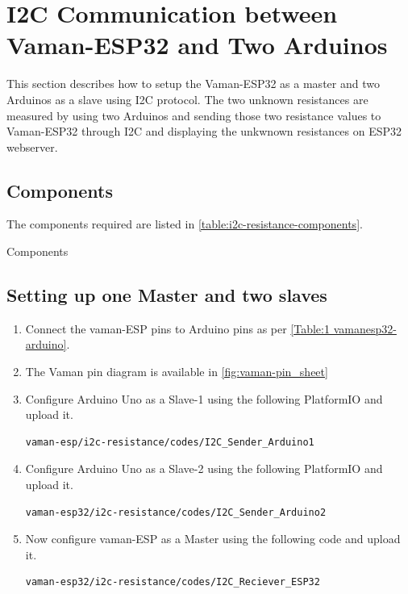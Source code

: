 \section{I2C Communication between Vaman-ESP32 and Two Arduinos}
This section describes how to setup the Vaman-ESP32 as a master and two Arduinos
as a slave using I2C protocol. The two unknown resistances are measured by using
two Arduinos and sending those two resistance values to Vaman-ESP32 through I2C
and displaying the unkwnown resistances on ESP32 webserver.
\subsection{Components}
The components required are listed in \autoref{table:i2c-resistance-components}.
\begin{table}[!ht]
\centering

\caption{Components}
\label{table:i2c-resistance-components}
\end{table}
\subsection{Setting up one Master and two slaves}
\begin{enumerate}
\item
Connect the vaman-ESP pins to Arduino pins as per \autoref{Table:1
vamanesp32-arduino}.
\begin{table}[!ht]
\centering

\caption{}
\label{Table:1 vamanesp32-arduino}
\end{table}
\item The Vaman pin diagram is available in \autoref{fig:vaman-pin_sheet}
\item
Configure Arduino Uno as a Slave-1 using the following PlatformIO and upload it.
\begin{lstlisting}
vaman-esp/i2c-resistance/codes/I2C_Sender_Arduino1
\end{lstlisting}

\item
Configure Arduino Uno as a Slave-2 using the following PlatformIO and upload it.
\begin{lstlisting}
vaman-esp32/i2c-resistance/codes/I2C_Sender_Arduino2
\end{lstlisting}

\item
Now configure vaman-ESP as a Master using the following code and upload it.
\begin{lstlisting}
vaman-esp32/i2c-resistance/codes/I2C_Reciever_ESP32
\end{lstlisting}
\end{enumerate}

